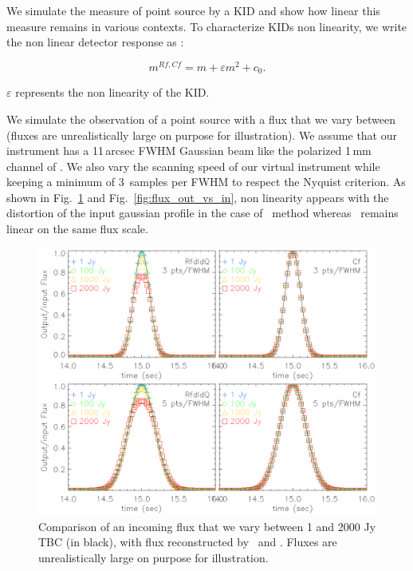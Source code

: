 We simulate the measure of point source by a KID and show how linear this measure remains in various contexts. To characterize KIDs non linearity, we write the non linear detector response as :

\begin{equation}
m^{Rf,Cf} = m + \varepsilon m^2 +c_{0}.
\label{eq:model_kid_nl}
\end{equation}

$\varepsilon$ represents the non linearity of the KID.

We simulate the observation of a point source with a flux
that we vary between  (fluxes are unrealistically large on purpose for illustration). We assume that our instrument has
a 11\,arcsec FWHM Gaussian beam like the polarized 1\,mm channel of \nikad. We
also vary the scanning speed of our virtual instrument while keeping a minimum
of 3~samples per FWHM to respect the Nyquist criterion.
As shown in Fig.~\ref{fig:planet_profiles} and Fig.~\ref{fig:flux_out_vs_in}, non linearity appears with the distortion of the input gaussian profile in the case of \rf\ method whereas \cf\ remains linear on the same flux scale.

\begin{figure}
  \includegraphics[clip, angle=0, width=\columnwidth]{Figures/planet_profiles.eps}
  \caption{Comparison of an incoming flux that we vary between 1 and 2000 Jy TBC (in black), with flux reconstructed by \rf\ and \cf. Fluxes are unrealistically large on purpose for illustration. }
  \label{fig:planet_profiles}
\end{figure}



